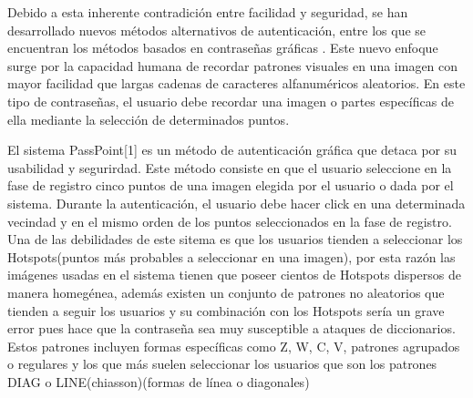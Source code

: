 \documentclass[12pt]{report}
\begin{document}
	Debido a esta inherente contradición entre facilidad y seguridad, se han desarrollado nuevos métodos alternativos de autenticación, entre los que se encuentran los métodos basados  en contraseñas gráficas . Este nuevo enfoque surge por la capacidad humana de recordar patrones visuales en una imagen con mayor facilidad que largas cadenas de caracteres alfanuméricos aleatorios. En este tipo de contraseñas, el usuario debe recordar una imagen o partes específicas de ella mediante la selección  de determinados puntos.
	
	El sistema PassPoint[1] es un método de autenticación gráfica que detaca por su usabilidad y segurirdad. Este método consiste  en que el usuario seleccione en la fase de registro  cinco puntos de una imagen elegida por el usuario o dada por el sistema. Durante la autenticación, el usuario debe hacer click en una determinada vecindad y en el mismo orden de los puntos seleccionados en la fase de  registro. Una de las debilidades de este sitema es que los usuarios tienden a seleccionar los Hotspots(puntos más probables a seleccionar en una imagen), por esta razón las imágenes usadas en el sistema tienen que poseer cientos de Hotspots dispersos de manera homegénea, además existen un conjunto de patrones no aleatorios que tienden a seguir los usuarios y su combinación con los Hotspots sería un grave error pues hace que la contraseña sea muy susceptible a ataques de diccionarios. Estos patrones incluyen formas específicas como Z, W, C, V, patrones agrupados o regulares y los que más suelen seleccionar los usuarios  que son los  patrones DIAG o LINE(chiasson)(formas de línea o diagonales)
	
	
\end{document}
